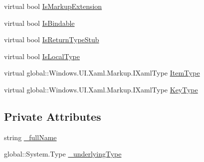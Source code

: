 \begin{DoxyCompactItemize}
\item 
virtual bool \hyperlink{class_e_l_i_client_1_1_e_l_i_client___xaml_type_info_1_1_xaml_system_base_type_a800ebdc92a613b08fb680efbae53a20e}{Is\+Markup\+Extension}
\item 
virtual bool \hyperlink{class_e_l_i_client_1_1_e_l_i_client___xaml_type_info_1_1_xaml_system_base_type_a848d5fef35e24829e45bc8c2312f338e}{Is\+Bindable}
\item 
virtual bool \hyperlink{class_e_l_i_client_1_1_e_l_i_client___xaml_type_info_1_1_xaml_system_base_type_aded18ae7db48c7a59cb0a4cc7bb78609}{Is\+Return\+Type\+Stub}
\item 
virtual bool \hyperlink{class_e_l_i_client_1_1_e_l_i_client___xaml_type_info_1_1_xaml_system_base_type_a92cc6114cec67a1f62893d1e7fbc2fc6}{Is\+Local\+Type}
\item 
virtual global\+::\+Windows.\+U\+I.\+Xaml.\+Markup.\+I\+Xaml\+Type \hyperlink{class_e_l_i_client_1_1_e_l_i_client___xaml_type_info_1_1_xaml_system_base_type_a9b886abedb8c80f8c9e093d0c78d2edb}{Item\+Type}
\item 
virtual global\+::\+Windows.\+U\+I.\+Xaml.\+Markup.\+I\+Xaml\+Type \hyperlink{class_e_l_i_client_1_1_e_l_i_client___xaml_type_info_1_1_xaml_system_base_type_a32127026279e5103840110e69ce6398a}{Key\+Type}
\end{DoxyCompactItemize}
\subsection*{Private Attributes}
\begin{DoxyCompactItemize}
\item 
string \hyperlink{class_e_l_i_client_1_1_e_l_i_client___xaml_type_info_1_1_xaml_system_base_type_a295e09d7bbf8efedbd9f4d33913de4c3}{\+\_\+full\+Name}
\item 
global\+::\+System.\+Type \hyperlink{class_e_l_i_client_1_1_e_l_i_client___xaml_type_info_1_1_xaml_system_base_type_a430e720312a0e631facc86c28c7dfe04}{\+\_\+underlying\+Type}
\end{DoxyCompactItemize}


